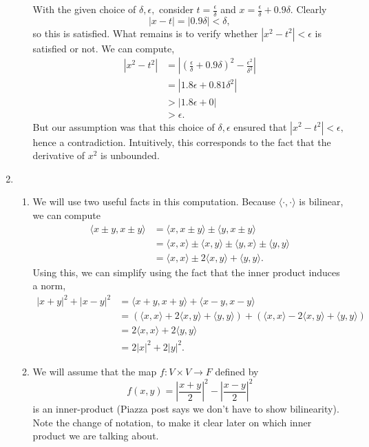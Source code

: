 \documentclass{article}
\numberwithin{equation}{section}
\begin{document}
\begin{enumerate}
\begin{enumerate}
        With the given choice of $\delta,\epsilon,$ consider $t = \frac{\epsilon}{\delta}$ and $x = \frac{\epsilon}{\delta} + 0.9\delta.$ Clearly 
        \begin{equation*}
            |x-t| = |0.9\delta| < \delta,
        \end{equation*}
        so this is satisfied. What remains is to verify whether $|x^2-t^2|<\epsilon$ is satisfied or not. We can compute,
        \begin{align}
            |x^2-t^2| &= \left|\left(\frac{\epsilon}{\delta}+0.9\delta\right)^2 - \frac{\epsilon^2}{\delta^2}\right| \\ 
            &= \left|1.8\epsilon + 0.81\delta^2\right| \\ 
            &> |1.8\epsilon + 0| \\ 
            &> \epsilon.
        \end{align}
        But our assumption was that this choice of $\delta,\epsilon$ ensured that $|x^2-t^2|<\epsilon,$ hence a contradiction. Intuitively, this corresponds to the fact that the derivative of $x^2$ is unbounded.
    \end{enumerate}
    \newpage
    \item \begin{enumerate}
        \item We will use two useful facts in this computation. Because $\langle \cdot ,\cdot \rangle$ is bilinear, we can compute
        \begin{align}
            \langle x \pm y, x \pm y\rangle &= \langle x,x\pm y\rangle \pm \langle y, x\pm y\rangle \\ 
            &= \langle x,x\rangle \pm \langle x,y\rangle \pm \langle y,x\rangle \pm \langle y,y\rangle \\ 
            &= \langle x,x\rangle \pm 2\langle x,y\rangle + \langle y,y\rangle.
        \end{align}
        Using this, we can simplify using the fact that the inner product induces a norm,
        \begin{align}
            |x+y|^2+|x-y|^2 &= \langle x+y,x+y\rangle + \langle x-y,x-y\rangle \\ 
            &= \left(\langle x,x\rangle + 2\langle x,y\rangle  + \langle y,y\rangle \right)+ \left(\langle x,x\rangle - 2\langle x,y\rangle + \langle y,y\rangle\right) \\ 
            &= 2\langle x,x\rangle + 2\langle y,y\rangle \\ 
            &= 2|x|^2+2|y|^2.
        \end{align}
        \item We will assume that the map $f:V\times V\to F$ defined by 
        \begin{equation*}
            f(x,y) = \left|\frac{x+y}{2}\right|^2 - \left|\frac{x-y}{2}\right|^2
        \end{equation*}
        is an inner-product (Piazza post says we don't have to show bilinearity). Note the change of notation, to make it clear later on which inner product we are talking about.
        

\end{enumerate}
\end{enumerate}
\end{document}

